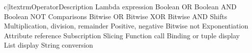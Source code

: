 \begin{tableii}{c|l}{textrm}{Operator}{Description}
    			{Lambda expression}
  \hline
    			{Boolean OR}
  \hline
    			{Boolean AND}
  \hline
    		{Boolean NOT}
  \hline
    \lineii{\code{<}, \code{<=}, \code{>}, \code{>=},
            \code{<>}, \code{!=}, \code{==}}
	   {Comparisons}
  \hline
    \lineii{\code{|}}				{Bitwise OR}
  \hline
    \lineii{\code{\^}}				{Bitwise XOR}
  \hline
    \lineii{\code{\&}}				{Bitwise AND}
  \hline
    \lineii{\code{<}\code{<}, \code{>}\code{>}}	{Shifts}
  \hline
  \hline
    \lineii{\code{*}, \code{/}, \code{\%}}
           {Multiplication, division, remainder}
  \hline
    	{Positive, negative}
    			{Bitwise not}
  \hline
    \lineii{\code{**}}				{Exponentiation}
  \hline
    	{Attribute reference}
    	{Subscription}
    	{Slicing}
    	{Function call}
  \hline
    	{Binding or tuple display}
    	{List display}
    	{String conversion}
\end{tableii}
